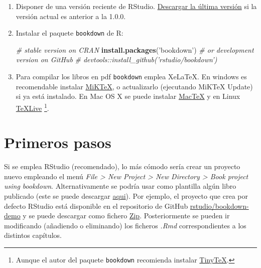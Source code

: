 \documentclass[]{book}
\newenvironment{Shaded}{\begin{snugshade}}{\end{snugshade}}
\newcommand{\KeywordTok}[1]{\textcolor[rgb]{0.13,0.29,0.53}{\textbf{#1}}}
\newcommand{\StringTok}[1]{\textcolor[rgb]{0.31,0.60,0.02}{#1}}
\newcommand{\CommentTok}[1]{\textcolor[rgb]{0.56,0.35,0.01}{\textit{#1}}}
\newcommand{\NormalTok}[1]{#1}
\let\rmarkdownfootnote\footnote%
\def\footnote{\protect\rmarkdownfootnote}
\theoremstyle{definition}
\theoremstyle{definition}
\theoremstyle{definition}
\theoremstyle{remark}
\begin{document}
\begin{enumerate}
\def\labelenumi{\arabic{enumi}.}
\item
  Disponer de una versión reciente de RStudio.
  \href{https://www.rstudio.com/products/rstudio/download/}{Descargar la
  última versión} si la versión actual es anterior a la 1.0.0.
\item
  Instalar el paquete \texttt{bookdown} de R:

\begin{Shaded}
\begin{Highlighting}[]
\CommentTok{# stable version on CRAN}
\KeywordTok{install.packages}\NormalTok{(}\StringTok{'bookdown'}\NormalTok{)}
\CommentTok{# or development version on GitHub}
\CommentTok{# devtools::install_github('rstudio/bookdown')}
\end{Highlighting}
\end{Shaded}
\item
  Para compilar los libros en pdf \texttt{bookdown} emplea XeLaTeX. En
  windows es recomendable instalar
  \href{https://miktex.org/download}{MiKTeX}, o actualizarlo (ejecutando
  MiKTeX Update) si ya está instalado. En Mac OS X se puede instalar
  \href{http://www.tug.org/mactex/}{MacTeX} y en Linux
  \href{http://www.tug.org/texlive}{TeXLive} \footnote{Aunque el autor
    del paquete \texttt{bookdown} recomienda instalar
    \href{https://yihui.name/tinytex}{TinyTeX}.}.
\end{enumerate}

\section{Primeros pasos}\label{primeros-pasos}

Si se emplea RStudio (recomendado), lo más cómodo sería crear un
proyecto nuevo empleando el menú \emph{File \textgreater{} New Project
\textgreater{} New Directory \textgreater{} Book project using
bookdown}. Alternativamente se podría usar como plantilla algún libro
publicado (este se puede descargar
\href{https://github.com/rubenfcasal/bookdown_intro/archive/master.zip}{aqui}).
Por ejemplo, el proyecto que crea por defecto RStudio está disponible en
el repositorio de GitHub
\href{https://github.com/rstudio/bookdown-demo}{rstudio/bookdown-demo} y
se puede descargar como fichero
\href{https://github.com/rstudio/bookdown-demo/archive/master.zip}{Zip}.
Posteriormente se pueden ir modificando (añadiendo o eliminando) los
ficheros \emph{.Rmd} correspondientes a los distintos capítulos.
\end{document}
